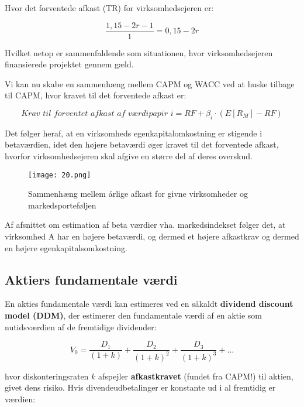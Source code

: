 \documentclass[10pt,reqno, usenames]{article}
\begin{document}
\begin{tcolorbox}[breakable, colback=red!5!white, colframe=red!50!black, title= Eksempel 9: Forholdet mellem gælds- og egenkapitalsfinansiering]
Hvor det forventede afkast (TR) for virksomhedsejeren er:

\begin{equation*}
    \frac{1,15 - 2r-1}{1} = 0,15 - 2r 
\end{equation*}

Hvilket netop er sammenfaldende som situationen, hvor virksomhedsejeren finansierede projektet gennem gæld. 
\end{tcolorbox}

Vi kan nu skabe en sammenhæng mellem CAPM og WACC ved at huske tilbage til CAPM, hvor kravet til det forventede afkast er:  

\begin{equation}
    \textit{Krav til forventet afkast af værdipapir i} = RF + \beta_i \cdot (E[R_M] - RF)
\end{equation}

Det følger heraf, at en virksomheds egenkapitalomkostning er stigende i betaværdien, idet den højere betaværdi øger kravet til det forventede afkast, hvorfor virksomhedsejeren skal afgive en større del af deres overskud. 

\begin{figure}[h]
     \centering
     \texttt{[image: 20.png]}
     \caption{Sammenhæng mellem årlige afkast for givne virksomheder og markedsporteføljen}
     \label{Figur 2}
\end{figure} 

Af afsnittet om estimation af beta værdier vha. markedsindekset følger det, at virksomhed A har en højere betaværdi, og dermed et højere afkastkrav og dermed en højere egenkapitalsomkostning.

\subsection{Aktiers fundamentale værdi}
En akties fundamentale værdi kan estimeres ved en såkaldt \textbf{dividend discount model (DDM)}, der estimerer den fundamentale værdi af en aktie som nutidsværdien af de fremtidige dividender:

\begin{equation}
     V_0 = \frac{D_1}{(1 + k)} + \frac{D_2}{(1 + k)^2} + \frac{D_3}{(1 + k)^3} + \ldots
\end{equation}

hvor diskonteringsraten $k$ afspejler \textbf{afkastkravet} (fundet fra CAPM!) til aktien, givet dens risiko. Hvis divendeudbetalinger er konstante ud i al fremtidig er værdien: 
\end{document}
